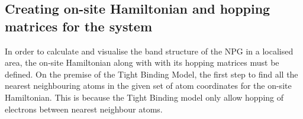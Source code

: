\subsection{Creating on-site Hamiltonian and hopping matrices for the system}
In order to calculate and visualise the band structure of the NPG in a localised area, the on-site Hamiltonian along with with its hopping matrices must be defined. On the premise of the Tight Binding Model, the first step to find all the nearest neighbouring atoms in the given set of atom coordinates for the on-site Hamiltonian. This is because the Tight Binding model only allow hopping of electrons between nearest neighbour atoms. 

